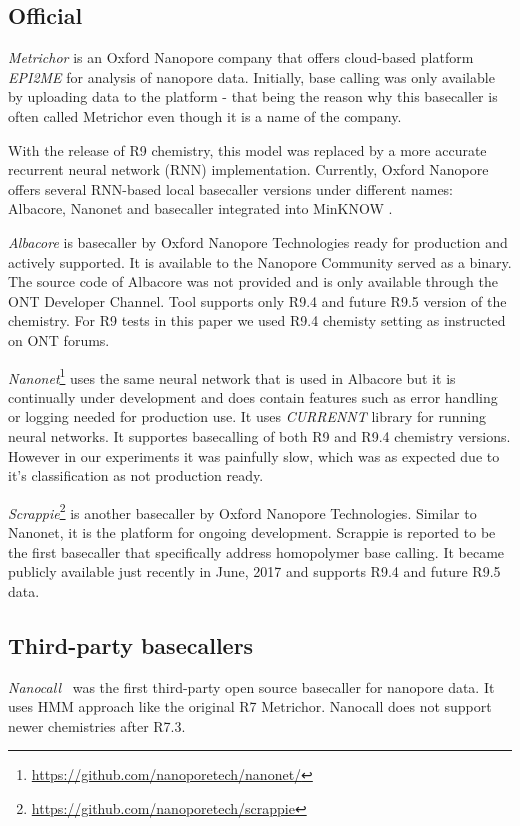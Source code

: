 \documentclass[runningheads,a4paper]{llncs}
\begin{document}
\subsection{Official}
\emph{Metrichor} is an Oxford Nanopore company that offers cloud-based platform \emph{EPI2ME} for analysis of nanopore data.
Initially, base calling was only available by uploading data to the platform - that being the reason why this basecaller is often called Metrichor even though it is a name of the company.

With the release of R9 chemistry, this model was replaced by a more accurate recurrent neural network (RNN) implementation. Currently, Oxford Nanopore offers several RNN-based local basecaller versions under different names: Albacore, Nanonet and basecaller integrated into MinKNOW \cite{ont-basecallers}.

\emph{Albacore} is basecaller by Oxford Nanopore Technologies ready for production and actively supported.
It is available to the Nanopore Community served as a binary. The source code of Albacore was not provided and is only available through the ONT Developer Channel. Tool supports only R9.4 and future R9.5 version of the chemistry. For R9 tests in this paper we used R9.4 chemisty setting as instructed on ONT forums.

\emph{Nanonet}\footnote{\url{https://github.com/nanoporetech/nanonet/}} uses the same neural network that is used in Albacore but it is continually under development and does contain features such as error handling or logging needed for production use. It uses \emph{CURRENNT} library for running neural networks. It supportes basecalling of both R9 and R9.4 chemistry versions. However in our experiments it was painfully slow, which was as expected due to it's classification as not production ready.

\emph{Scrappie}\footnote{\url{https://github.com/nanoporetech/scrappie}} is another basecaller by Oxford Nanopore Technologies. Similar to Nanonet, it is the platform for ongoing development. Scrappie is reported to be the first basecaller  that specifically address homopolymer base calling. It became publicly available just recently in June, 2017 and supports R9.4 and future R9.5 data.

\subsection{Third-party basecallers}
\emph{Nanocall}~\cite{David046086} was the first third-party open source basecaller for nanopore data. It uses HMM approach like the original R7 Metrichor. Nanocall does not support newer chemistries after R7.3.
\end{document}
